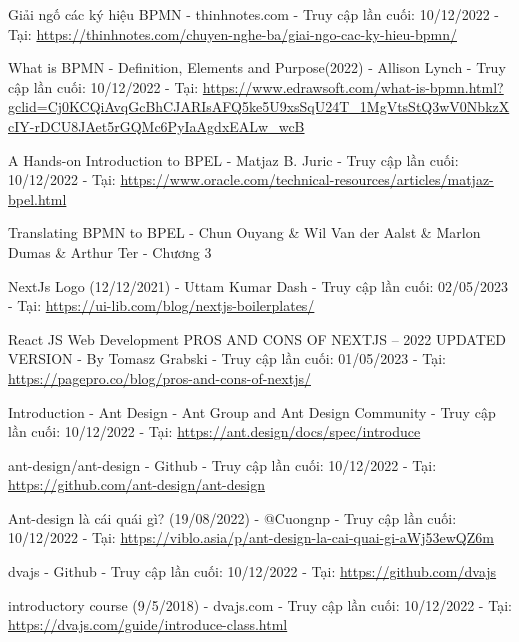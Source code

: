 
\begin{thebibliography}{9}
    Giải ngố các ký hiệu BPMN - thinhnotes.com - Truy cập lần cuối: 10/12/2022 - Tại: \url{https://thinhnotes.com/chuyen-nghe-ba/giai-ngo-cac-ky-hieu-bpmn/}

    What is BPMN - Definition, Elements and Purpose(2022) - Allison Lynch - Truy cập lần cuối: 10/12/2022 - Tại: \url{https://www.edrawsoft.com/what-is-bpmn.html?gclid=Cj0KCQiAvqGcBhCJARIsAFQ5ke5U9xsSqU24T_1MgVtsStQ3wV0NbkzXcIY-rDCU8JAet5rGQMc6PyIaAgdxEALw_wcB}

    A Hands-on Introduction to BPEL - Matjaz B. Juric - Truy cập lần cuối: 10/12/2022 - Tại: \url{https://www.oracle.com/technical-resources/articles/matjaz-bpel.html}

    Translating BPMN to BPEL - Chun Ouyang \& Wil Van der Aalst \& Marlon Dumas \& Arthur Ter - Chương 3

    NextJs Logo (12/12/2021) - Uttam Kumar Dash
    - Truy cập lần cuối: 02/05/2023 - Tại: \url{https://ui-lib.com/blog/nextjs-boilerplates/}


    React JS Web Development PROS AND CONS OF NEXTJS – 2022 UPDATED VERSION - By Tomasz Grabski - Truy cập lần cuối: 01/05/2023 - Tại: \url{https://pagepro.co/blog/pros-and-cons-of-nextjs/}

    Introduction - Ant Design - Ant Group and Ant Design Community - Truy cập lần cuối: 10/12/2022 - Tại: \url{https://ant.design/docs/spec/introduce}

    ant-design/ant-design - Github - Truy cập lần cuối: 10/12/2022 - Tại: \url{https://github.com/ant-design/ant-design}

    Ant-design là cái quái gì? (19/08/2022) - @Cuongnp - Truy cập lần cuối: 10/12/2022 - Tại: \url{https://viblo.asia/p/ant-design-la-cai-quai-gi-aWj53ewQZ6m}

    dvajs - Github - Truy cập lần cuối: 10/12/2022 - Tại: \url{https://github.com/dvajs}

    introductory course (9/5/2018) - dvajs.com - Truy cập lần cuối: 10/12/2022 - Tại: \url{https://dvajs.com/guide/introduce-class.html}


\end{thebibliography}
